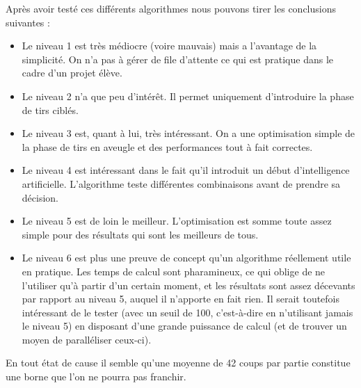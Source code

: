 Après avoir testé ces différents algorithmes nous pouvons tirer les conclusions suivantes :
\begin{itemize}
\item Le niveau 1 est très médiocre (voire mauvais) mais a l'avantage de la simplicité. On n'a pas à gérer de file d'attente ce qui est pratique dans le cadre d'un projet élève.
\item Le niveau 2 n'a que peu d'intérêt. Il permet uniquement d'introduire la phase de tirs ciblés.
\item Le niveau 3 est, quant à lui, très intéressant. On a une optimisation simple de la phase de tirs en aveugle et des performances tout à fait correctes.
\item Le niveau 4 est intéressant dans le fait qu'il introduit un début d'intelligence artificielle. L'algorithme teste différentes combinaisons avant de prendre sa décision. 
\item Le niveau 5 est de loin le meilleur. L'optimisation est somme toute assez simple pour des résultats qui sont les meilleurs de tous.
\item Le niveau 6 est plus une preuve de concept qu'un algorithme réellement utile en pratique. Les temps de calcul sont pharamineux, ce qui oblige de ne l'utiliser qu'à partir d'un certain moment, et les résultats sont assez décevants par rapport au niveau 5, auquel il n'apporte en fait rien. Il serait toutefois intéressant de le tester (avec un seuil de 100, c'est-à-dire en n'utilisant jamais le niveau 5) en disposant d'une grande puissance de calcul (et de trouver un moyen de paralléliser ceux-ci).
\end{itemize}

\medskip

En tout état de cause il semble qu'une moyenne de 42 coups par partie constitue une borne que l'on ne pourra pas franchir.

%
